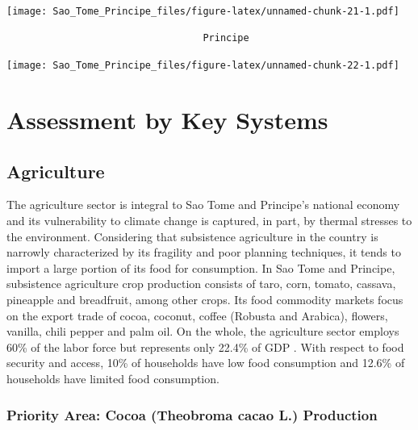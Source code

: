 \documentclass[
]{book}
\begin{document}
\texttt{[image: Sao\_Tome\_Principe\_files/figure-latex/unnamed-chunk-21-1.pdf]}

\begin{verbatim}
                                  Principe
\end{verbatim}

\texttt{[image: Sao\_Tome\_Principe\_files/figure-latex/unnamed-chunk-22-1.pdf]}

\hypertarget{assessment-by-key-systems}{%
\section{Assessment by Key Systems}\label{assessment-by-key-systems}}

\hypertarget{agriculture}{%
\subsection{Agriculture}\label{agriculture}}

The agriculture sector is integral to Sao Tome and Principe's national economy and its vulnerability to climate change is captured, in part, by thermal stresses to the environment. Considering that subsistence agriculture in the country is narrowly characterized by its fragility and poor planning techniques, it tends to import a large portion of its food for consumption. In Sao Tome and Principe, subsistence agriculture crop production consists of taro, corn, tomato, cassava, pineapple and breadfruit, among other crops. Its food commodity markets focus on the export trade of cocoa, coconut, coffee (Robusta and Arabica), flowers, vanilla, chili pepper and palm oil. On the whole, the agriculture sector employs 60\% of the labor force but represents only 22.4\% of GDP . With respect to food security and access, 10\% of households have low food consumption and 12.6\% of households have limited food consumption.

\hypertarget{priority-area-cocoa-theobroma-cacao-l.-production}{%
\subsubsection{Priority Area: Cocoa (Theobroma cacao L.) Production}\label{priority-area-cocoa-theobroma-cacao-l.-production}}
\end{document}
